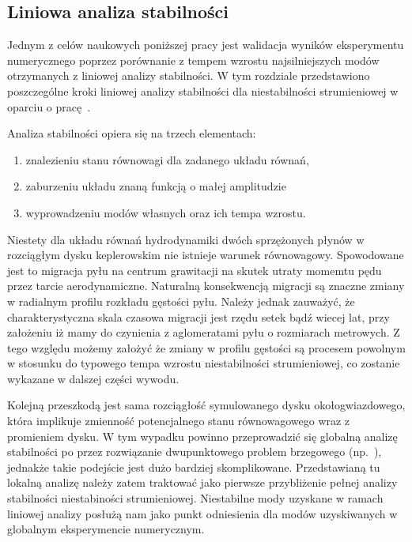 \subsection{Liniowa analiza stabilności}
\label{sec:lsa}
Jednym z celów naukowych poniższej pracy jest walidacja wyników eksperymentu
numerycznego poprzez porównanie z tempem wzrostu najsilniejszych modów
otrzymanych z liniowej analizy stabilności. W tym rozdziale przedstawiono
poszczególne kroki liniowej analizy stabilności dla niestabilności strumieniowej
w oparciu o pracę~\citep{YG05}.

Analiza stabilności opiera się na trzech elementach:
\begin{enumerate}
   \item znalezieniu stanu równowagi dla zadanego układu równań,
   \item zaburzeniu układu znaną funkcją o małej amplitudzie 
   \item wyprowadzeniu modów własnych oraz ich tempa wzrostu.
\end{enumerate}
Niestety dla układu równań hydrodynamiki dwóch sprzężonych płynów w rozciągłym
dysku keplerowskim nie istnieje warunek równowagowy. Spowodowane jest to
migracja pyłu na centrum grawitacji na skutek utraty momemtu pędu przez tarcie
aerodynamiczne. Naturalną konsekwencją migracji są znaczne zmiany w radialnym
profilu rozkładu gęstości pyłu. Należy jednak zauważyć, że charakterystyczna
skala czasowa migracji jest rzędu setek bądź wiecej lat, przy założeniu iż mamy
do czynienia z aglomeratami pyłu o rozmiarach metrowych. Z tego względu możemy
założyć że zmiany w profilu gęstości są procesem powolnym w stosunku do typowego
tempa wzrostu niestabilności strumieniowej, co zostanie wykazane w dalszej
części wywodu.

Kolejną przeszkodą jest sama rozciągłość symulowanego dysku okołogwiazdowego,
która implikuje zmienność potencjalnego stanu równowagowego wraz z promieniem
dysku. W tym wypadku powinno przeprowadzić się globalną analizę stabilności po
przez rozwiązanie dwupunktowego problem brzegowego (np.~\cite{PHM04, KH06}),
jednakże takie podejście jest dużo bardziej skomplikowane. Przedstawianą tu
lokalną analizę należy zatem traktować jako pierwsze przybliżenie pełnej analizy
stabilności niestabiności strumieniowej. Niestabilne mody uzyskane w ramach
liniowej analizy posłużą nam jako punkt odniesienia dla modów uzyskiwanych w
globalnym eksperymencie numerycznym.

